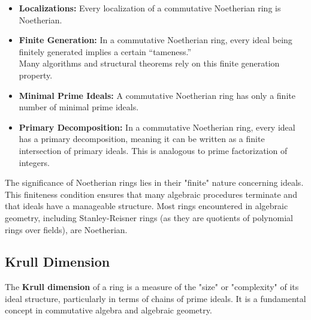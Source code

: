 \documentclass[12pt]{article}
\theoremstyle{definition}
\numberwithin{equation}{subsection}
\begin{document}
\begin{itemize}
\begin{proof}
\begin{itemize}
\end{itemize}
Furthermore, since $J_k \subseteq J_{k+1}$, it follows that $A_k \subseteq A_{k+1}$. Thus, we have an ascending chain of ideals in $R$:
$A_1 \subseteq A_2 \subseteq A_3 \subseteq \cdots$
Since $R$ is Noetherian, this chain must stabilize. Therefore, there exists an integer $N$ such that $A_N = A_{N+1} = A_{N+2} = \cdots$.
Now, we need to show that this implies the chain $J_1 \subseteq J_2 \subseteq J_3 \subseteq \cdots$ also stabilizes.
For any $k \ge N$, we have $A_k = A_N$.
Since $\pi$ is a surjective homomorphism, $\pi(A_k) = J_k$.
Thus, for $k \ge N$, $J_k = \pi(A_k) = \pi(A_N) = J_N$.
This shows that the chain of ideals in $R/I$ stabilizes at $J_N$.
Therefore, $R/I$ satisfies the ascending chain condition on ideals, which means $R/I$ is a Noetherian ring.
\end{proof}
\item \textbf{Localizations:} Every localization of a commutative Noetherian ring is Noetherian.
\item \textbf{Finite Generation:} In a commutative Noetherian ring, every ideal being finitely generated implies a certain ``tameness.''\\
Many algorithms and structural theorems rely on this finite generation property.
\item \textbf{Minimal Prime Ideals:} A commutative Noetherian ring has only a finite number of minimal prime ideals.
\item \textbf{Primary Decomposition:} In a commutative Noetherian ring, every ideal has a primary decomposition, meaning it can be written as a finite intersection of primary ideals. This is analogous to prime factorization of integers.
\end{itemize}
The significance of Noetherian rings lies in their "finite" nature concerning ideals. This finiteness condition ensures that many algebraic procedures terminate and that ideals have a manageable structure. Most rings encountered in algebraic geometry, including Stanley-Reisner rings (as they are quotients of polynomial rings over fields), are Noetherian.   


\subsection{Krull Dimension}
The \textbf{Krull dimension} of a ring is a measure of the "size" or "complexity" of its ideal structure, particularly in terms of chains of prime ideals. It is a fundamental concept in commutative algebra and algebraic geometry.
\end{document}
